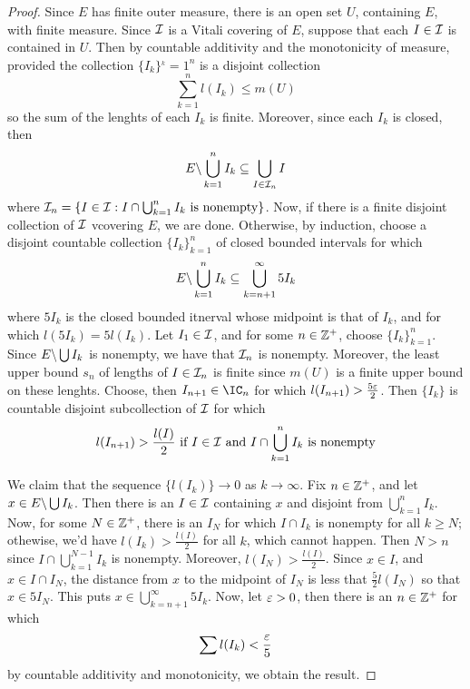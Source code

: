 \begin{proof}
    Since $E$ has finite outer measure, there is an open set $U$, containing
    $E$, with finite measure. Since  $\mathcal{I}$ is a Vitali covering of  $E$, suppose
    that each  $I \in \mathcal{I}$ is contained in  $U$. Then by countable additivity
    and the monotonicity of measure, provided the collection $\{I_k\}^_k=1^n$ is
    a disjoint collection
    \begin{equation*}
        \sum_{k=1}^n{l(I_k)} \leq m(U)
    \end{equation*}
    so the sum of the lenghts of each $I_k$ is finite. Moreover, since each
    $I_k$ is closed, then
    \begin{equation*}
        E \backslash \bigcup_{k=1}^n{I_k} \subseteq \bigcup_{I \in \mathcal{I}_n}{I}
    \end{equation*}
    where $\mathcal{I}_n=\{I \in \mathcal{I} : I \cap \bigcup_{k=1}^n{I_k} \text{ is
    nonempty}\}$. Now, if there is a finite disjoint collection of $\mathcal{I}$
    vcovering  $E$, we are done. Otherwise, by induction, choose a disjoint
    countable collection  $\{I_k\}_{k=1}^n$ of closed bounded intervals for
    which
    \begin{equation*}
        E \backslash \bigcup_{k=1}^n{I_k} \subseteq \bigcup_{k=n+1}^\infty{5I_k}
    \end{equation*}
    where $5I_k$ is the closed bounded itnerval whose midpoint is that of
    $I_k$, and for which  $l(5I_k)=5l(I_k)$. Let $I_1 \in \mathcal{I}$, and for some $n
    \in \mathbb{Z}^+$, choose  $\{I_k\}_{k=1}^n$. Since $E \backslash \bigcup{I_k}$ is
    nonempty, we have that $\mathcal{I}_n$ is nonempty. Moreover, the least upper bound
     $s_n$ of lengths of  $I \in \mathcal{I}_n$ is finite since  $m(U)$ is a finite
     upper bound on these lenghts. Choose, then $I_{n+1} \in \IC_n$ for which
     $l(I_{n+1})>\frac{5\varepsilon}{2}$. Then $\{I_k\}$ is countable disjoint
     subcollection of $\mathcal{I}$ for which
     \begin{equation*}
         l(I_{n+1})>\frac{l(I)}{2} \text{ if } I \in \mathcal{I} \text{ and }
         I \cap \bigcup_{k=1}^n{I_k} \text{ is nonempty}
     \end{equation*}

     We claim that the sequence $\{l(I_k)\} \xrightarrow{} 0$ as $k
     \xrightarrow{} \infty$. Fix $n \in \mathbb{Z}^+$, and let  $x \in
     E \backslash \bigcup{I_k}$. Then there is an $I \in \mathcal{I}$ containing  $x$ and
     disjoint from  $\bigcup_{k=1}^n{I_k}$. Now, for some $N \in \mathbb{Z}^+$, there is
     an  $I_N$ for which  $I \cap I_k$ is nonempty for all  $k \geq N$;
     othewise, we'd have  $l(I_k)>\frac{l(I)}{2}$ for all $k$, which cannot
     happen. Then  $N>n$ since  $I \cap \bigcup_{k=1}^{N-1}{I_k}$ is nonempty.
     Moreover, $l(I_N)>\frac{l(I)}{2}$. Since $x \in I$, and  $x \in I \cap
     I_N$, the distance from $x$ to the midpoint of  $I_N$ is less that
     $\frac{5}{2}l(I_N)$ so that $x \in 5I_N$. This puts  $x \in
     \bigcup_{k=n+1}^\infty{5I_k}$. Now, let $\varepsilon>0$, then there is an  $n \in
     \mathbb{Z}^+$ for which
     \begin{equation*}
         \sum{l(I_k)}<\frac{\varepsilon}{5}
     \end{equation*}
     by countable additivity and monotonicity, we obtain the result.
\end{proof}

